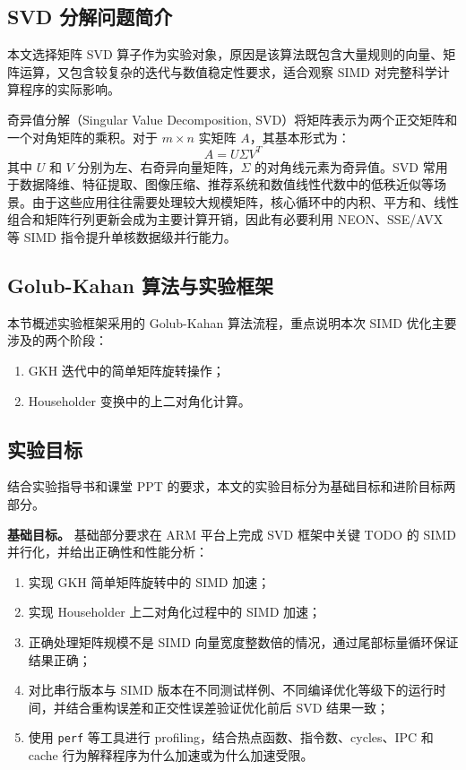 \documentclass[UTF8,a4paper]{ctexart}
\begin{document}
\subsection{SVD 分解问题简介}
本文选择矩阵 SVD 算子作为实验对象，原因是该算法既包含大量规则的向量、矩阵运算，又包含较复杂的迭代与数值稳定性要求，适合观察 SIMD 对完整科学计算程序的实际影响。

奇异值分解（Singular Value Decomposition, SVD）将矩阵表示为两个正交矩阵和一个对角矩阵的乘积。对于 \(m\times n\) 实矩阵 \(A\)，其基本形式为：
\[
  A = U \Sigma V^T
\]
其中 \(U\) 和 \(V\) 分别为左、右奇异向量矩阵，\(\Sigma\) 的对角线元素为奇异值。SVD 常用于数据降维、特征提取、图像压缩、推荐系统和数值线性代数中的低秩近似等场景。由于这些应用往往需要处理较大规模矩阵，核心循环中的内积、平方和、线性组合和矩阵行列更新会成为主要计算开销，因此有必要利用 NEON、SSE/AVX 等 SIMD 指令提升单核数据级并行能力。

\subsection{Golub-Kahan 算法与实验框架}
本节概述实验框架采用的 Golub-Kahan 算法流程，重点说明本次 SIMD 优化主要涉及的两个阶段：
\begin{enumerate}
  \item GKH 迭代中的简单矩阵旋转操作；
  \item Householder 变换中的上二对角化计算。
\end{enumerate}

\subsection{实验目标}
结合实验指导书和课堂 PPT 的要求，本文的实验目标分为基础目标和进阶目标两部分。

\textbf{基础目标。} 基础部分要求在 ARM 平台上完成 SVD 框架中关键 TODO 的 SIMD 并行化，并给出正确性和性能分析：
\begin{enumerate}
  \item 实现 GKH 简单矩阵旋转中的 SIMD 加速；
  \item 实现 Householder 上二对角化过程中的 SIMD 加速；
  \item 正确处理矩阵规模不是 SIMD 向量宽度整数倍的情况，通过尾部标量循环保证结果正确；
  \item 对比串行版本与 SIMD 版本在不同测试样例、不同编译优化等级下的运行时间，并结合重构误差和正交性误差验证优化前后 SVD 结果一致；
  \item 使用 \texttt{perf} 等工具进行 profiling，结合热点函数、指令数、cycles、IPC 和 cache 行为解释程序为什么加速或为什么加速受限。
\end{enumerate}
\end{document}
